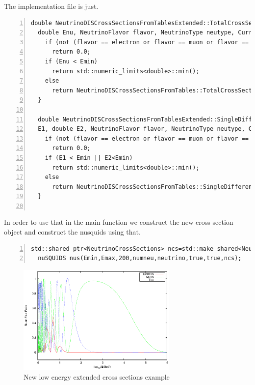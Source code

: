 The implementation file is just.
\begin{lstlisting}[frame=leftline, numbers =
  left,breaklines=true,label = ex:sin1]
  double NeutrinoDISCrossSectionsFromTablesExtended::TotalCrossSection(
  double Enu, NeutrinoFlavor flavor, NeutrinoType neutype, Current current) const{
    if (not (flavor == electron or flavor == muon or flavor == tau))
      return 0.0;
    if (Enu < Emin)
      return std::numeric_limits<double>::min();
    else
      return NeutrinoDISCrossSectionsFromTables::TotalCrossSection(Enu, flavor, neutype, current);
  }
  
  double NeutrinoDISCrossSectionsFromTablesExtended::SingleDifferentialCrossSection(double
  E1, double E2, NeutrinoFlavor flavor, NeutrinoType neutype, Current current) const{
    if (not (flavor == electron or flavor == muon or flavor == tau))
      return 0.0;
    if (E1 < Emin || E2<Emin)
      return std::numeric_limits<double>::min();
    else
      return NeutrinoDISCrossSectionsFromTables::SingleDifferentialCrossSection(E1, E2, flavor, neutype, current);
  }
 
\end{lstlisting}

In order to use that in the main function we construct the new cross
section object and construct the nusquids using that.

\begin{lstlisting}[frame=leftline, numbers =
  left,breaklines=true,label = ex:sin1]
  std::shared_ptr<NeutrinoCrossSections> ncs=std::make_shared<NeutrinoDISCrossSectionsFromTablesExtended>();
  nuSQUIDS nus(Emin,Emax,200,numneu,neutrino,true,true,ncs);
\end{lstlisting}


\begin{figure}[h!]
  \label{fig:crossext}
  \centering
  \includegraphics[width=0.7\textwidth]{fig/crossext.eps} 
  \caption{New low energy extended cross sections example} 
\end{figure}


